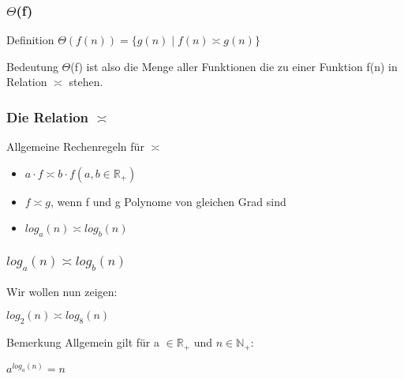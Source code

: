 \documentclass{beamer}
\begin{document}
\begin{frame}
	\frametitle{$\Theta$(f)}
	\begin{block}{Definition}
		$\Theta(f(n)) = \{ g(n) \mid f(n) \asymp g(n)\}$
	\end{block}
	\begin{block}{Bedeutung}
		$\Theta$(f) ist also die Menge aller Funktionen die zu einer Funktion f(n) in Relation $\asymp$ stehen.
	\end{block}
\end{frame}

\begin{frame}
	\frametitle{Die Relation $\asymp$}
	\begin{block}{Allgemeine Rechenregeln f\"ur $\asymp$}
		\begin{itemize}
			\item $a \cdot f \asymp b \cdot f (a, b \in \mathbb R_+)$
			\item $f \asymp g$, wenn f und g Polynome von gleichen Grad sind
			\item $log_a(n) \asymp log_b(n)$
		\end{itemize}
	\end{block}
\end{frame}

\begin{frame}
	\frametitle{$log_a(n) \asymp log_b(n)$}
	\begin{block}{ }
		Wir wollen nun zeigen:
		\begin{center}
			$log_2(n) \asymp log_8(n)$
		\end{center}
	\end{block}
	\begin{block}{Bemerkung}
		Allgemein gilt f\"ur a $\in \mathbb R_+$ und $n \in \mathbb N_+$:
		\begin{center}
			$a^{log_a(n)} = n$
		\end{center}
	\end{block}
\end{frame}
\end{document}
